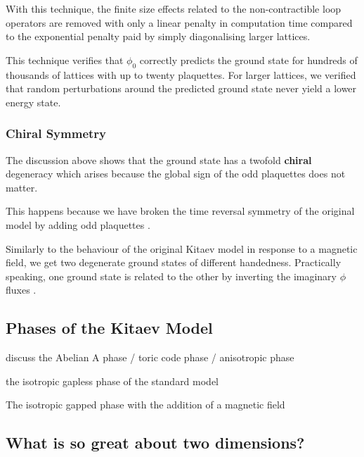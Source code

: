 With this technique, the finite size effects related to the non-contractible loop operators are removed with only a linear penalty in computation time compared to the exponential penalty paid by simply diagonalising larger lattices.

This technique verifies that \(\phi_0\) correctly predicts the ground state for hundreds of thousands of lattices with up to twenty plaquettes. For larger lattices, we verified that random perturbations around the predicted ground state never yield a lower energy state.

\hypertarget{chiral-symmetry}{%
\subsubsection{Chiral Symmetry}\label{chiral-symmetry}}

The discussion above shows that the ground state has a twofold \textbf{chiral} degeneracy which arises because the global sign of the odd plaquettes does not matter.

This happens because we have broken the time reversal symmetry of the original model by adding odd plaquettes \autocite{Chua2011,yaoExactChiralSpin2007,ChuaPRB2011,Fiete2012,Natori2016,Wu2009,Peri2020,WangHaoranPRB2021}.

Similarly to the behaviour of the original Kitaev model in response to a magnetic field, we get two degenerate ground states of different handedness. Practically speaking, one ground state is related to the other by inverting the imaginary \(\phi\) fluxes \autocite{yaoExactChiralSpin2007}.

\hypertarget{phases-of-the-kitaev-model}{%
\subsection{Phases of the Kitaev Model}\label{phases-of-the-kitaev-model}}

discuss the Abelian A phase / toric code phase / anisotropic phase

the isotropic gapless phase of the standard model

The isotropic gapped phase with the addition of a magnetic field

\hypertarget{what-is-so-great-about-two-dimensions}{%
\subsection{What is so great about two dimensions?}\label{what-is-so-great-about-two-dimensions}}

